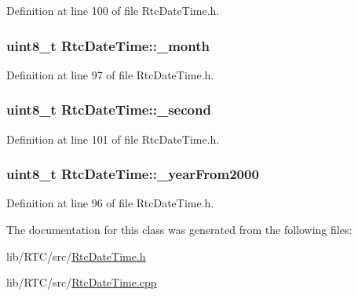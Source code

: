 Definition at line 100 of file Rtc\+Date\+Time.\+h.

\subsubsection[{\texorpdfstring{\+\_\+month}{_month}}]{\setlength{\rightskip}{0pt plus 5cm}uint8\+\_\+t Rtc\+Date\+Time\+::\+\_\+month\hspace{0.3cm}{\ttfamily [protected]}}\hypertarget{class_rtc_date_time_ac330113b94c1bc110ad7dbc3a263f03a}{}\label{class_rtc_date_time_ac330113b94c1bc110ad7dbc3a263f03a}


Definition at line 97 of file Rtc\+Date\+Time.\+h.

\subsubsection[{\texorpdfstring{\+\_\+second}{_second}}]{\setlength{\rightskip}{0pt plus 5cm}uint8\+\_\+t Rtc\+Date\+Time\+::\+\_\+second\hspace{0.3cm}{\ttfamily [protected]}}\hypertarget{class_rtc_date_time_ad3c0899907fa14a51be81be3122d0a80}{}\label{class_rtc_date_time_ad3c0899907fa14a51be81be3122d0a80}


Definition at line 101 of file Rtc\+Date\+Time.\+h.

\subsubsection[{\texorpdfstring{\+\_\+year\+From2000}{_yearFrom2000}}]{\setlength{\rightskip}{0pt plus 5cm}uint8\+\_\+t Rtc\+Date\+Time\+::\+\_\+year\+From2000\hspace{0.3cm}{\ttfamily [protected]}}\hypertarget{class_rtc_date_time_a782f920fa91c813d1f34116f8ef58e17}{}\label{class_rtc_date_time_a782f920fa91c813d1f34116f8ef58e17}


Definition at line 96 of file Rtc\+Date\+Time.\+h.



The documentation for this class was generated from the following files\+:\begin{DoxyCompactItemize}
\item 
lib/\+R\+T\+C/src/\hyperlink{_rtc_date_time_8h}{Rtc\+Date\+Time.\+h}\item 
lib/\+R\+T\+C/src/\hyperlink{_rtc_date_time_8cpp}{Rtc\+Date\+Time.\+cpp}\end{DoxyCompactItemize}
